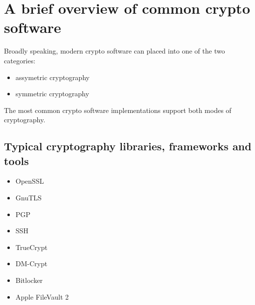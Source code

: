 \section{A brief overview of common crypto software}

Broadly speaking, modern crypto software can placed into one of the two categories:

\begin{itemize}
\item assymetric cryptography 
\item symmetric cryptography
\end{itemize}

The most common crypto software implementations support both modes of cryptography. 

\subsection{Typical cryptography libraries, frameworks and tools}

\begin{itemize}
\item OpenSSL
\item GnuTLS
\item PGP
\item SSH
\item TrueCrypt
\item DM-Crypt
\item Bitlocker %
\item Apple FileVault 2
\end{itemize}





